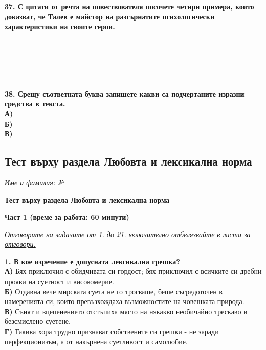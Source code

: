 \documentclass[12pt,a4paper]{article}
\begin{document}
\vspace{0.6cm}

\noindent
\textbf{37. С цитати от речта на повествователя посочете четири примера, които доказват, че Талев е майстор на разгърнатите психологически характеристики на своите герои.} \\
\noindent
\makebox[\textwidth]{\dotfill} \\
\makebox[\textwidth]{\dotfill} \\
\makebox[\textwidth]{\dotfill} \\
\makebox[\textwidth]{\dotfill} \\
\makebox[\textwidth]{\dotfill} \\
\makebox[\textwidth]{\dotfill}

\vspace{0.6cm}

\noindent
\textbf{38. Срещу съответната буква запишете какви са подчертаните изразни средства в текста.} \\
\noindent
\textbf{А)} \makebox[0.8\textwidth]{\dotfill} \\
\textbf{Б)} \makebox[0.8\textwidth]{\dotfill} \\
\textbf{В)} \makebox[0.8\textwidth]{\dotfill}
\newpage
\subsection{Тест върху раздела Любовта и лексикална норма}
\noindent
\textit{Име и фамилия:} \dotfill \textit{№} \makebox[2cm]{\dotfill}

\vspace{0.6cm}

\begin{center}
    {\large\bfseries Тест върху раздела Любовта и лексикална норма}
\end{center}

\vspace{0.6cm}

\noindent
\textbf{Част 1 (време за работа: 60 минути)}

\vspace{0.3cm}

\noindent
\underline{\textit{Отговорите на задачите от 1. до 21. включително отбелязвайте в листа за отговори.}}

\vspace{0.5cm}

\noindent
\textbf{1. В кое изречение е допусната лексикална грешка?} \\
\noindent
\textbf{А)} Бях приключил с обидчивата си гордост; бях приключил с всичките си дребни прояви на суетност и високомерие. \\
\textbf{Б)} Отдавна вече мирската суета не го трогваше, беше съсредоточен в намеренията си, които превъзхождаха възможностите на човешката природа. \\
\textbf{В)} Сънят и вцепенението отстъпиха място на някакво необичайно трескаво и безсмислено суетене. \\
\textbf{Г)} Такива хора трудно признават собствените си грешки - не заради перфекционизъм, а от накърнена суетливост и самолюбие.
\end{document}
